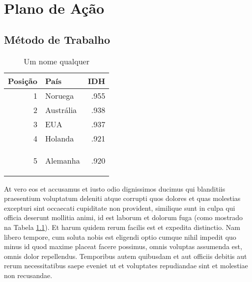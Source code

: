 %
%

\chapter{Plano de A\c{c}\~{a}o}
\lipsum[1]

\section{M\'{e}todo de Trabalho}
\lipsum[11]


\begin{table}[h]
\centering
\caption{Um nome qualquer}
\vspace{0.5cm}
\begin{tabular}{r|lr}
 
Posi\c{c}\~ao & Pa\'is & IDH \\ %
\hline                               %
1 & Noruega        & .955 \\
2 & Austr{\'a}lia  & .938 \\
3 & EUA            & .937 \\
4 & Holanda        & .921 \\
5 & Alemanha       & .920            %
 
\label{tab:tabela1}
\end{tabular}
\end{table}

At vero eos et accusamus et iusto odio dignissimos ducimus qui blanditiis praesentium voluptatum deleniti atque corrupti quos dolores et quas molestias excepturi sint occaecati cupiditate non provident, similique sunt in culpa qui officia deserunt mollitia animi, id est laborum et dolorum fuga (como mostrado na Tabela \ref{tab:tabela1}). Et harum quidem rerum facilis est et expedita distinctio. Nam libero tempore, cum soluta nobis est eligendi optio cumque nihil impedit quo minus id quod maxime placeat facere possimus, omnis voluptas assumenda est, omnis dolor repellendus. Temporibus autem quibusdam et aut officiis debitis aut rerum necessitatibus saepe eveniet ut et voluptates repudiandae sint et molestiae non recusandae.

